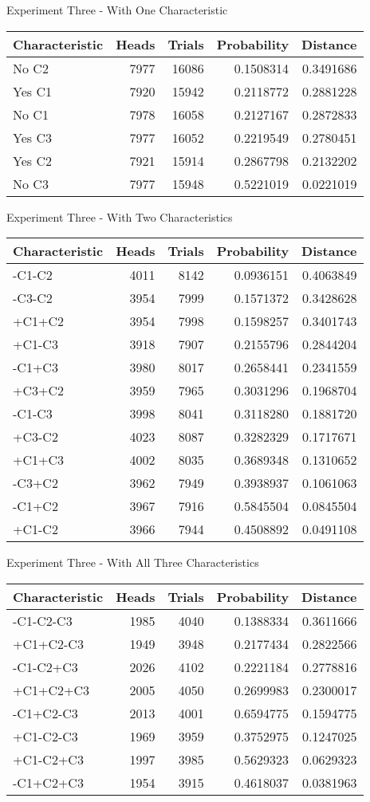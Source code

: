 \documentclass[
  ignorenonframetext,
]{beamer}
\renewcommand{\,}{\text{, }}
\begin{document}
\begin{frame}{Experiment Three - With One Characteristic}
\protect\hypertarget{experiment-three---with-one-characteristic}{}

\begin{longtable}[]{@{}lrrrr@{}}
\toprule
Characteristic & Heads & Trials & Probability & Distance\tabularnewline
\midrule
\endhead
No C2 & 7977 & 16086 & 0.1508314 & 0.3491686\tabularnewline
Yes C1 & 7920 & 15942 & 0.2118772 & 0.2881228\tabularnewline
No C1 & 7978 & 16058 & 0.2127167 & 0.2872833\tabularnewline
Yes C3 & 7977 & 16052 & 0.2219549 & 0.2780451\tabularnewline
Yes C2 & 7921 & 15914 & 0.2867798 & 0.2132202\tabularnewline
No C3 & 7977 & 15948 & 0.5221019 & 0.0221019\tabularnewline
\bottomrule
\end{longtable}

\end{frame}

\begin{frame}{Experiment Three - With Two Characteristics}
\protect\hypertarget{experiment-three---with-two-characteristics}{}

\begin{longtable}[]{@{}lrrrr@{}}
\toprule
Characteristic & Heads & Trials & Probability & Distance\tabularnewline
\midrule
\endhead
-C1-C2 & 4011 & 8142 & 0.0936151 & 0.4063849\tabularnewline
-C3-C2 & 3954 & 7999 & 0.1571372 & 0.3428628\tabularnewline
+C1+C2 & 3954 & 7998 & 0.1598257 & 0.3401743\tabularnewline
+C1-C3 & 3918 & 7907 & 0.2155796 & 0.2844204\tabularnewline
-C1+C3 & 3980 & 8017 & 0.2658441 & 0.2341559\tabularnewline
+C3+C2 & 3959 & 7965 & 0.3031296 & 0.1968704\tabularnewline
-C1-C3 & 3998 & 8041 & 0.3118280 & 0.1881720\tabularnewline
+C3-C2 & 4023 & 8087 & 0.3282329 & 0.1717671\tabularnewline
+C1+C3 & 4002 & 8035 & 0.3689348 & 0.1310652\tabularnewline
-C3+C2 & 3962 & 7949 & 0.3938937 & 0.1061063\tabularnewline
-C1+C2 & 3967 & 7916 & 0.5845504 & 0.0845504\tabularnewline
+C1-C2 & 3966 & 7944 & 0.4508892 & 0.0491108\tabularnewline
\bottomrule
\end{longtable}

\end{frame}

\begin{frame}{Experiment Three - With All Three Characteristics}
\protect\hypertarget{experiment-three---with-all-three-characteristics}{}

\begin{longtable}[]{@{}lrrrr@{}}
\toprule
Characteristic & Heads & Trials & Probability & Distance\tabularnewline
\midrule
\endhead
-C1-C2-C3 & 1985 & 4040 & 0.1388334 & 0.3611666\tabularnewline
+C1+C2-C3 & 1949 & 3948 & 0.2177434 & 0.2822566\tabularnewline
-C1-C2+C3 & 2026 & 4102 & 0.2221184 & 0.2778816\tabularnewline
+C1+C2+C3 & 2005 & 4050 & 0.2699983 & 0.2300017\tabularnewline
-C1+C2-C3 & 2013 & 4001 & 0.6594775 & 0.1594775\tabularnewline
+C1-C2-C3 & 1969 & 3959 & 0.3752975 & 0.1247025\tabularnewline
+C1-C2+C3 & 1997 & 3985 & 0.5629323 & 0.0629323\tabularnewline
-C1+C2+C3 & 1954 & 3915 & 0.4618037 & 0.0381963\tabularnewline
\bottomrule
\end{longtable}

\end{frame}
\end{document}
